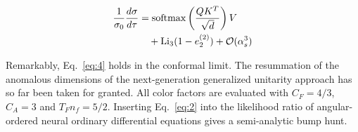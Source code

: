 \begin{align}
  \frac{1}{\sigma_0} \frac{d\sigma}{d\tau} &= \mathrm{softmax}\left(\frac{Q K^T}{\sqrt{d}}\right) V \nonumber \\
  &\quad + \mathrm{Li}_{3}(1 - e_2^{(2)}) + \mathcal{O}(\alpha_s^3) \label{eq:6}
\end{align}

Remarkably, Eq.~\eqref{eq:4} holds in the conformal limit. The
resummation of the anomalous dimensions of the next-generation
generalized unitarity approach has so far been taken for granted. All
color factors are evaluated with $C_F = 4/3$, $C_A = 3$ and $T_F n_f =
5/2$. Inserting Eq.~\eqref{eq:2} into the likelihood ratio of
angular-ordered neural ordinary differential equations gives a
semi-analytic bump hunt.

